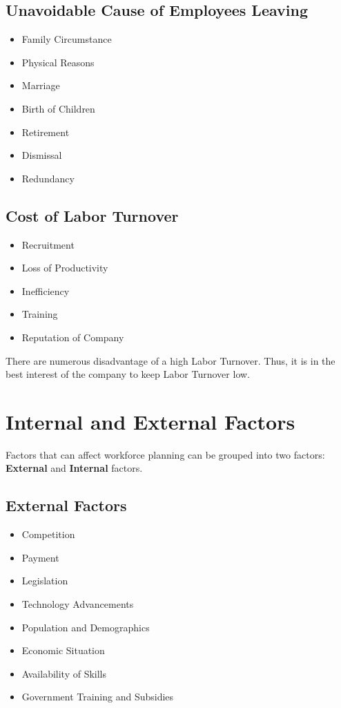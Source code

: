 \documentclass{report}
\begin{document}
\subsection{Unavoidable Cause of Employees Leaving}
\begin{itemize}
	\item Family Circumstance
	\item Physical Reasons
	\item Marriage
	\item Birth of Children
	\item Retirement
	\item Dismissal
	\item Redundancy
\end{itemize}

\subsection{Cost of Labor Turnover}
\begin{itemize}
	\item Recruitment
	\item Loss of Productivity
	\item Inefficiency
	\item Training
	\item Reputation of Company
\end{itemize}

There are numerous disadvantage of a high Labor Turnover.
Thus, it is in the best interest of the company to keep Labor Turnover low.

\section{Internal and External Factors}

Factors that can affect workforce planning can be grouped into two factors: \textbf{External} and \textbf{Internal} factors.

\subsection{External Factors}
\begin{itemize}
	\item Competition
	\item Payment
	\item Legislation
	\item Technology Advancements
	\item Population and Demographics
	\item Economic Situation
	\item Availability of Skills
	\item Government Training and Subsidies
\end{itemize}
\end{document}
